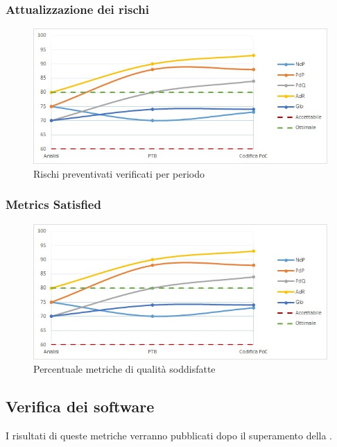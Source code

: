 \subsubsection{Attualizzazione dei rischi}
\begin{figure}[H]
  \centering
  \includegraphics[scale=0.8]{immagini/gulpease.jpg}
  \caption{Rischi preventivati verificati per periodo}
\end{figure}

\subsubsection{Metrics Satisfied}
\begin{figure}[H]
  \centering
  \includegraphics[scale=0.8]{immagini/gulpease.jpg}
  \caption{Percentuale metriche di qualità soddisfatte}
\end{figure}


\subsection{Verifica dei software}\label{subsection:verifica_software}
I risultati di queste metriche verranno pubblicati dopo il superamento della \RTB{}.